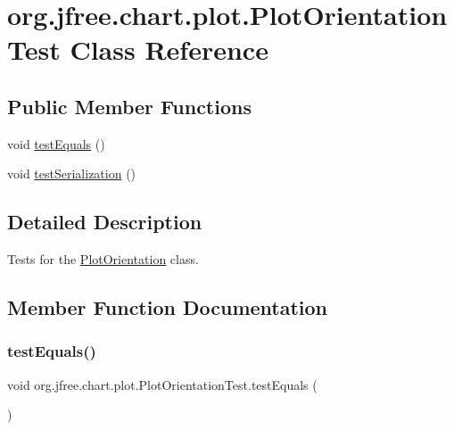 \hypertarget{classorg_1_1jfree_1_1chart_1_1plot_1_1_plot_orientation_test}{}\section{org.\+jfree.\+chart.\+plot.\+Plot\+Orientation\+Test Class Reference}
\label{classorg_1_1jfree_1_1chart_1_1plot_1_1_plot_orientation_test}
\subsection*{Public Member Functions}
\begin{DoxyCompactItemize}
\item 
void \mbox{\hyperlink{classorg_1_1jfree_1_1chart_1_1plot_1_1_plot_orientation_test_a6b3794db3eb782a80bb49e918473d65b}{test\+Equals}} ()
\item 
void \mbox{\hyperlink{classorg_1_1jfree_1_1chart_1_1plot_1_1_plot_orientation_test_ac5e6bfaa72e66fa9de0b37daa1a14bae}{test\+Serialization}} ()
\end{DoxyCompactItemize}


\subsection{Detailed Description}
Tests for the \mbox{\hyperlink{classorg_1_1jfree_1_1chart_1_1plot_1_1_plot_orientation}{Plot\+Orientation}} class. 

\subsection{Member Function Documentation}
\mbox{\label{classorg_1_1jfree_1_1chart_1_1plot_1_1_plot_orientation_test_a6b3794db3eb782a80bb49e918473d65b}} 
\subsubsection{\texorpdfstring{test\+Equals()}{testEquals()}}
{\footnotesize\ttfamily void org.\+jfree.\+chart.\+plot.\+Plot\+Orientation\+Test.\+test\+Equals (\begin{DoxyParamCaption}{ }\end{DoxyParamCaption})}

